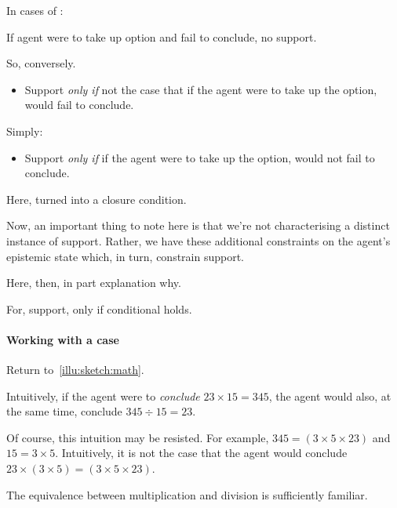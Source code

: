 \begin{note}
  \begin{idea}
    In cases of \zS{}:

    If agent were to take up option and fail to conclude, no support.
  \end{idea}
\end{note}

\begin{note}
  So, conversely.

  \begin{itemize}
  \item
    Support \emph{only if} not the case that if the agent were to take up the option, would fail to conclude.
  \end{itemize}

  Simply:

  \begin{itemize}
  \item
    Support \emph{only if} if the agent were to take up the option, would not fail to conclude.
  \end{itemize}

  Here, turned into a closure condition.
\end{note}

\begin{note}
  \color{red}

  Now, an important thing to note here is that we're not characterising a distinct instance of support.
  Rather, we have these additional constraints on the agent's epistemic state which, in turn, constrain support.

  Here, then, in part explanation why.

  For, support, only if conditional holds.
\end{note}

\paragraph*{Working with a case}

\begin{note}
  Return to~\autoref{illu:sketch:math}.

  \begin{quote}
  \end{quote}

  Intuitively, if the agent were to \emph{conclude} \(23 \times 15 = 345\), the agent would also, at the same time, conclude \(345 \div 15 = 23\).

  Of course, this intuition may be resisted.
  For example, \(345 = (3 \times 5 \times 23)\) and \(15 = 3 \times 5\).
  Intuitively, it is not the case that the agent would conclude \(23 \times (3 \times 5) = (3 \times 5 \times 23)\).

  The equivalence between multiplication and division is sufficiently familiar.
\end{note}

